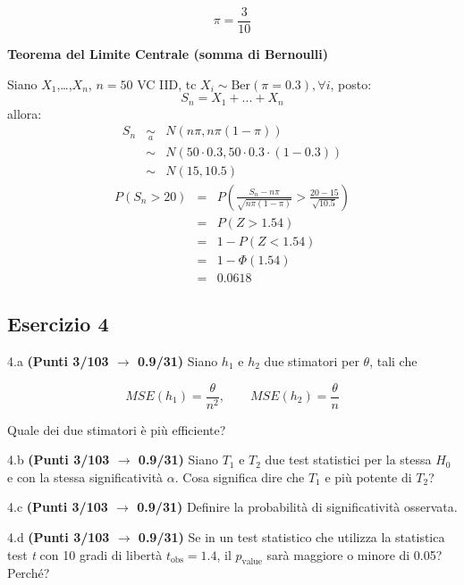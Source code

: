 \documentclass[
  11pt,
]{book}
\theoremstyle{mytheoremstyle}
\theoremstyle{mydefstyle}
\newenvironment{sol}
  {
  \begin{tcolorbox}[enhanced,breakable,arc=0.1mm,boxrule=1pt,colback=white,colframe=iblue,
  title=\bf \fontfamily{lmss}\selectfont \hspace{.5 cm} Soluzione,drop fuzzy shadow]

}{
\end{tcolorbox}
  }
\begin{document}
\begin{sol}
\[
\pi=\frac 3{10}
\]

\textbf{Teorema del Limite Centrale (somma di Bernoulli)}

Siano \(X_1\),\ldots,\(X_n\), \(n=50\) VC IID, tc \(X_i\sim\text{Ber}(\pi=0.3)\)\(,\forall i\), posto:
\[
      S_n = X_1 + ... + X_n
      \]
allora:\begin{eqnarray*}
  S_n & \mathop{\sim}\limits_{a}& N(n\pi,n\pi(1-\pi)) \\
      &\sim & N(50\cdot0.3,50\cdot0.3\cdot(1-0.3)) \\
      &\sim & N(15,10.5)
  \end{eqnarray*}\begin{eqnarray*}
      P( S_n   >   20 ) 
        &=& P\left(  \frac { S_n  -  n\pi }{ \sqrt{n\pi(1-\pi)} }  >  \frac { 20  -  15 }{\sqrt{ 10.5 }} \right)  \\
                 &=& P\left(  Z   >   1.54 \right) \\    &=& 1-P(Z< 1.54 )\\ 
                 &=&  1-\Phi( 1.54 ) \\ &=&  0.0618 
      \end{eqnarray*}

\end{sol}

\subsection{Esercizio 4}\label{esercizio-4-13}

4.a \textbf{(Punti 3/103 \(\rightarrow\) 0.9/31)} Siano \(h_1\) e \(h_2\) due stimatori per \(\theta\), tali che

\[
  MSE(h_1) =  \frac{\theta}{n^2}, \qquad  MSE(h_2) =  \frac{\theta}{n}
\]

Quale dei due stimatori è più efficiente?

4.b \textbf{(Punti 3/103 \(\rightarrow\) 0.9/31)} Siano \(T_1\) e \(T_2\) due test statistici per la stessa \(H_0\) e con la stessa significatività \(\alpha\). Cosa significa dire che \(T_1\) e più potente di \(T_2\)?

4.c \textbf{(Punti 3/103 \(\rightarrow\) 0.9/31)} Definire la probabilità di significatività osservata.

4.d \textbf{(Punti 3/103 \(\rightarrow\) 0.9/31)} Se in un test statistico che utilizza la statistica test \emph{t} con 10 gradi di libertà \(t_\text{obs}=1.4\), il \(p_\text{value}\) sarà maggiore o minore di 0.05? Perché?
\end{document}
